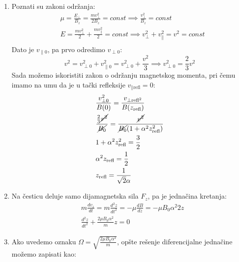 \documentclass[fleqn]{report}
\begin{document}
\begin{enumerate}
          \begin{enumerate}
              \item Poznati su zakoni održanja:
                    \begin{align*}
                         & \mu = \frac{E_\perp}{B_z} = \frac{mv_\perp^2}{2B_z} = const \implies \frac{v_\perp^2}{B_z} = const           \\
                         & E = \frac{mv_\perp^2}{2} + \frac{mv_\parallel^2}{2} = const \implies v_\perp^2 + v_\parallel^2 = v^2 = const \\
                    \end{align*}
                    Dato je $v_{\parallel 0}$, pa prvo odredimo $v_{\perp 0}$:
                    \[ v^2 = v_{\perp 0}^2 + v_{\parallel 0}^2 = v_{\perp 0}^2 + \frac{v^2}{3} \implies v_{\perp 0}^2 = \frac{2}{3} v^2 \]
                    Sada možemo iskoristiti zakon o održanju magnetskog momenta, pri čemu imamo na umu da je u tački refleksije $v_{\parallel \text{refl}} = 0$:
                    \begin{align*}
                         & \frac{v_{\perp 0}^2}{B(0)} = \frac{v_{\perp \text{refl}^2}}{B(z_\text{refl})}                                   \\
                         & \frac{\frac{2}{3}\cancel{v^2}}{\cancel{B_0}} = \frac{\cancel{v^2}}{\cancel{B_0} (1 + \alpha^2 z_\text{refl}^2)} \\
                         & 1 + \alpha^2 z_\text{refl}^2 = \frac{3}{2}                                                                      \\
                         & \alpha^2 z_\text{refl} = \frac{1}{2}                                                                            \\
                         & z_\text{refl} = \frac{1}{\sqrt2 \alpha}
                    \end{align*}
              \item Na česticu deluje samo dijamagnetska sila $F_z$, pa je jednačina kretanja:
                    \begin{align*}
                         & m \frac{dv_z}{dt} = m \frac{d^2 z}{dt^2} = -\mu \frac{dB}{dz} = -\mu B_0 \alpha^2 2z \\
                         & \frac{d^2 z}{dt^2} + \frac{2 \mu B_0 \alpha^2}{m} z = 0
                    \end{align*}
              \item Ako uvedemo oznaku $\Omega = \sqrt{\frac{2 \mu B_0 \alpha^2}{m}}$, opšte rešenje diferencijalne jednačine možemo zapisati kao:

\end{enumerate}
\end{enumerate}
\end{document}
